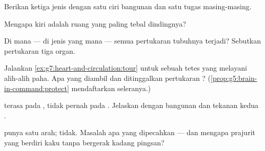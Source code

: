 \begin{exercise}[$\star$]\label{exo:g7:heart-and-circulation:4}
Berikan ketiga jenis  dengan satu ciri bangunan dan satu
tugas masing-masing.
\end{exercise}

\begin{exercise}[$\star$]\label{exo:g7:heart-and-circulation:5}
Mengapa  kiri adalah ruang yang paling tebal dindingnya?
\end{exercise}

\begin{exercise}[$\star$]\label{exo:g7:heart-and-circulation:6}
Di mana --- di jenis  yang mana --- semua pertukaran tubuhnya
terjadi? Sebutkan pertukaran  tiga organ.
\end{exercise}

\begin{exercise}[$\star\star$]\label{exo:g7:heart-and-circulation:7}
Jalankan \cref{ex:g7:heart-and-circulation:tour} untuk sebuah tetes
yang melayani  alih-alih paha. Apa yang diambil dan ditinggalkan
pertukaran  ?
(\cref{prop:g5:brain-in-command:protect} mendaftarkan seleranya.)
\end{exercise}

\begin{exercise}[$\star\star$]\label{exo:g7:heart-and-circulation:8}
 terasa pada , tidak pernah pada . Jelaskan
dengan bangunan dan tekanan kedua .
\end{exercise}

\begin{exercise}[$\star\star$]\label{exo:g7:heart-and-circulation:9}
 punya  satu arah;  tidak. Masalah apa yang dipecahkan
  --- dan mengapa prajurit yang berdiri kaku tanpa
bergerak kadang pingsan?
\end{exercise}

